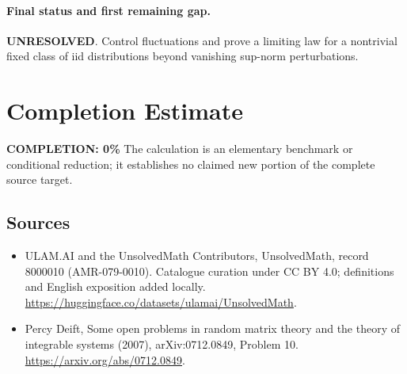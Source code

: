 \documentclass[11pt]{article}
\begin{document}
\paragraph{Final status and first remaining gap.}
\textbf{UNRESOLVED}. Control fluctuations and prove a limiting law for a nontrivial fixed class of iid distributions beyond vanishing sup-norm perturbations.

\section{Completion Estimate}
\noindent\textbf{COMPLETION: 0\%}
The calculation is an elementary benchmark or conditional reduction; it establishes no claimed new portion of the complete source target.

\subsection{Sources}
\begin{itemize}
\item[\hypertarget{source:8000010:1}{S1}] ULAM.AI and the UnsolvedMath Contributors, UnsolvedMath, record 8000010 (AMR-079-0010). Catalogue curation under CC BY 4.0; definitions and English exposition added locally.
\url{https://huggingface.co/datasets/ulamai/UnsolvedMath}.
\item[\hypertarget{source:8000010:2}{S2}] Percy Deift, Some open problems in random matrix theory and the theory of integrable systems (2007), arXiv:0712.0849, Problem 10.
\url{https://arxiv.org/abs/0712.0849}.
\end{itemize}
\label{end:8000010}
\end{document}
